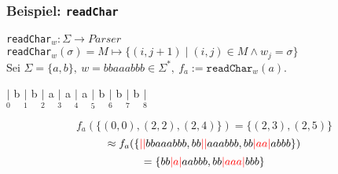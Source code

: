 \documentclass{beamer}
\newcommand{\red}[1]{\textcolor{red}{#1}}
\begin{document}
    \begin{frame}[t]
        \frametitle{\textbf{Beispiel:} \texttt{readChar}}
        \texttt{readChar}$_w : \Sigma \to Parser$\\
        \texttt{readChar}$_w(\sigma) = M \mapsto \{(i, j+1) \mid (i,j) \in M \land w_j = \sigma\}$\\[10pt]
        Sei $\Sigma = \{a,b\},\ w = bbaaabbb \in \Sigma^*,\ f_a := \texttt{readChar}_w(a)$.\\
        \begin{center}
            $\underset{0}{|}$
                {\Large b}
            $\underset{1}{|}$
                {\Large b}
            $\underset{2}{|}$
                {\Large a}
            $\underset{3}{|}$
                {\Large a}
            $\underset{4}{|}$
                {\Large a}
            $\underset{5}{|}$
                {\Large b}
            $\underset{6}{|}$
                {\Large b}
            $\underset{7}{|}$
                {\Large b}
            $\underset{8}{|}$\\[30pt]
        \end{center}
        \pause
        $$
            f_a(\{(0,0), (2,2), (2,4)\}) = \{(2,3), (2,5)\}
        $$
        \pause
        $$
            \approx f_a(\{\red{||}bbaaabbb, bb\red{||}aaabbb, bb\red{|aa|}abbb\})
            $$$$
            = \{bb\red{|a|}aabbb, bb\red{|aaa|}bbb\}
        $$
    \end{frame}


\end{document}
